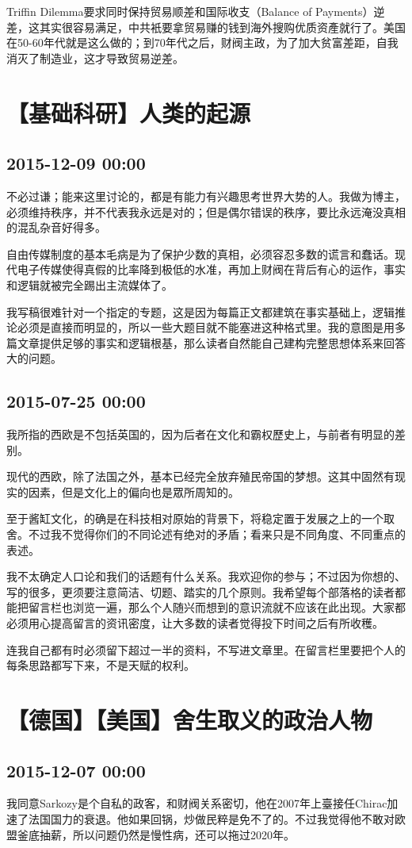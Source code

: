 \documentclass[twocolumn]{ctexart}
\begin{document}
Triffin Dilemma要求同时保持贸易顺差和国际收支（Balance of Payments）逆差，这其实很容易满足，中共衹要拿贸易赚的钱到海外搜购优质资產就行了。美国在50-60年代就是这么做的；到70年代之后，财阀主政，为了加大贫富差距，自我消灭了制造业，这才导致贸易逆差。\section*{【基础科研】人类的起源}
\subsection*{2015-12-09 00:00}
不必过谦；能来这里讨论的，都是有能力有兴趣思考世界大势的人。我做为博主，必须维持秩序，并不代表我永远是对的；但是偶尔错误的秩序，要比永远淹没真相的混乱杂音好得多。

自由传媒制度的基本毛病是为了保护少数的真相，必须容忍多数的谎言和蠢话。现代电子传媒使得真假的比率降到极低的水准，再加上财阀在背后有心的运作，事实和逻辑就被完全踢出主流媒体了。

我写稿很难针对一个指定的专题，这是因为每篇正文都建筑在事实基础上，逻辑推论必须是直接而明显的，所以一些大题目就不能塞进这种格式里。我的意图是用多篇文章提供足够的事实和逻辑根基，那么读者自然能自己建构完整思想体系来回答大的问题。\subsection*{2015-07-25 00:00}
我所指的西欧是不包括英国的，因为后者在文化和霸权歷史上，与前者有明显的差别。

现代的西欧，除了法国之外，基本已经完全放弃殖民帝国的梦想。这其中固然有现实的因素，但是文化上的偏向也是眾所周知的。

至于酱缸文化，的确是在科技相对原始的背景下，将稳定置于发展之上的一个取舍。不过我不觉得你们的不同论述有绝对的矛盾；看来只是不同角度、不同重点的表述。

我不太确定人口论和我们的话题有什么关系。我欢迎你的参与；不过因为你想的、写的很多，更须要注意简洁、切题、踏实的几个原则。我希望每个部落格的读者都能把留言栏也浏览一遍，那么个人随兴而想到的意识流就不应该在此出现。大家都必须用心提高留言的资讯密度，让大多数的读者觉得投下时间之后有所收穫。

连我自己都有时必须留下超过一半的资料，不写进文章里。在留言栏里要把个人的每条思路都写下来，不是天赋的权利。\section*{【德国】【美国】舍生取义的政治人物}
\subsection*{2015-12-07 00:00}
我同意Sarkozy是个自私的政客，和财阀关系密切，他在2007年上臺接任Chirac加速了法国国力的衰退。他如果回锅，炒做民粹是免不了的。不过我觉得他不敢对欧盟釜底抽薪，所以问题仍然是慢性病，还可以拖过2020年。
\end{document}
